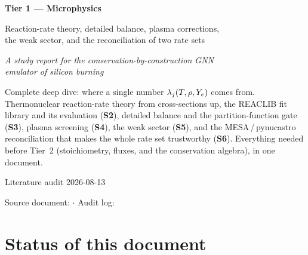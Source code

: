 
\begin{titlepage}
\centering
\vspace*{3.5cm}

{\Huge\bfseries Tier 1 --- Microphysics\par}

\vspace{1.2em}
{\Large Reaction-rate theory, detailed balance, plasma corrections,\\[0.3em]
the weak sector, and the reconciliation of two rate sets\par}

\vspace{0.8em}
{\large\itshape A study report for the conservation-by-construction GNN\\
emulator of silicon burning\par}

\vspace{3em}
\begin{minipage}{0.82\textwidth}
\small
Complete deep dive: where a single number $\lambda_j(T,\rho,Y_{e})$ comes from.
Thermonuclear reaction-rate theory from cross-sections up, the REACLIB fit
library and its evaluation (\textbf{S2}), detailed balance and the
partition-function gate (\textbf{S3}), plasma screening (\textbf{S4}), the weak
sector (\textbf{S5}), and the MESA\,/\,pynucastro reconciliation that makes the
whole rate set trustworthy (\textbf{S6}). Everything needed before Tier~2
(stoichiometry, fluxes, and the conservation algebra), in one document.
\end{minipage}

\vfill
{\small Literature audit 2026-08-13\par}
\vspace{0.5em}
{\small Source document:  \quad$\cdot$\quad
Audit log: \par}
\end{titlepage}

\section*{Status of this document}
\label{sec:status}


